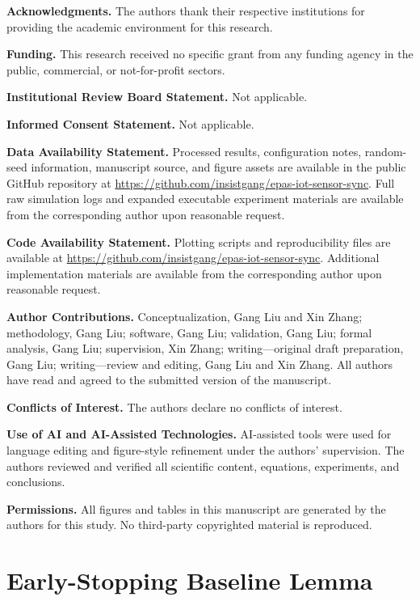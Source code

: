 \documentclass[10pt]{article}
\renewcommand{\thelemma}{\arabic{section}.\arabic{lemma}}
\begin{document}
\textbf{Acknowledgments.} The authors thank their respective institutions for providing the academic environment for this research.

\textbf{Funding.} This research received no specific grant from any funding agency in the public, commercial, or not-for-profit sectors.

\textbf{Institutional Review Board Statement.} Not applicable.

\textbf{Informed Consent Statement.} Not applicable.

\textbf{Data Availability Statement.} Processed results, configuration notes, random-seed information, manuscript source, and figure assets are available in the public GitHub repository at \url{https://github.com/insistgang/epas-iot-sensor-sync}. Full raw simulation logs and expanded executable experiment materials are available from the corresponding author upon reasonable request.

\textbf{Code Availability Statement.} Plotting scripts and reproducibility files are available at \url{https://github.com/insistgang/epas-iot-sensor-sync}. Additional implementation materials are available from the corresponding author upon reasonable request.

\textbf{Author Contributions.} Conceptualization, Gang Liu and Xin Zhang; methodology, Gang Liu; software, Gang Liu; validation, Gang Liu; formal analysis, Gang Liu; supervision, Xin Zhang; writing---original draft preparation, Gang Liu; writing---review and editing, Gang Liu and Xin Zhang. All authors have read and agreed to the submitted version of the manuscript.

\textbf{Conflicts of Interest.} The authors declare no conflicts of interest.

\textbf{Use of AI and AI-Assisted Technologies.} AI-assisted tools were used for language editing and figure-style refinement under the authors' supervision. The authors reviewed and verified all scientific content, equations, experiments, and conclusions.

\textbf{Permissions.} All figures and tables in this manuscript are generated by the authors for this study. No third-party copyrighted material is reproduced.

\appendix
\renewcommand{\thelemma}{\Alph{section}.\arabic{lemma}}
\section{Early-Stopping Baseline Lemma}\label{app:earlystop}
\end{document}
